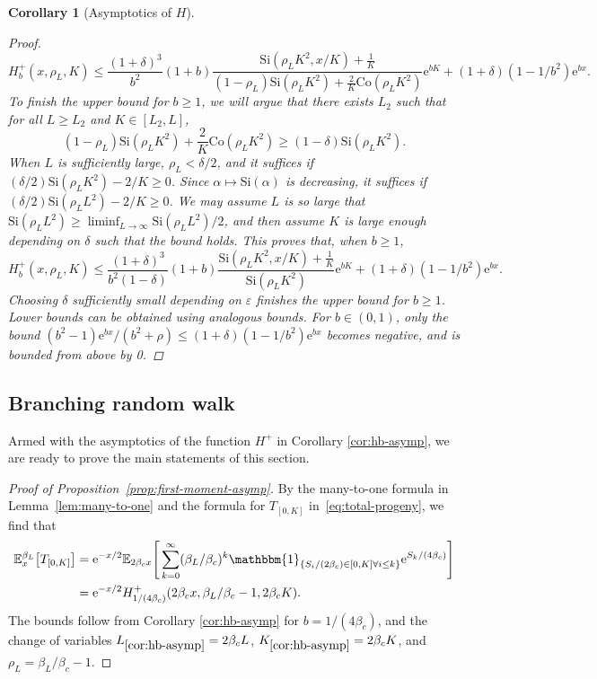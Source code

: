 \documentclass[a4paper, a4wide, 10pt, reqno]{amsart}
\theoremstyle{plain}
\newtheorem{corollary}[theorem]{Corollary}
\theoremstyle{definition}
\numberwithin{equation}{section}
\newcommand{\E}{\mathbb E}
\newcommand{\re}{{\mathrm e}}
\newcommand{\Co}{{\mathrm{Co}}}
\newcommand{\Si}{{\mathrm{Si}}}
\newcommand{\ind}[1]{\mathbbm{1}_{\{#1\}}}
\begin{document}
\begin{corollary}[Asymptotics of $H$]
\begin{proof}
\[        H_b^+(x, \rho_L, K) \le \frac{(1+\delta)^3}{b^2}(1+b)\frac{\Si(\rho_L K^2, x/K) + \frac{1}{K}}{(1-\rho_L)\Si(\rho_L K^2) + \frac{2}{K}\Co(\rho_L K^2)}\re^{bK} + (1+\delta)(1-1/b^2)\re^{bx}.
        \]
        To finish the upper bound for $b\ge 1$, we will argue that there exists $L_2$ such that for all $L\ge L_2$ and $K\in[L_2, L]$,
        \begin{equation}\label{eq:asymp-h-2}
        (1-\rho_L)\Si(\rho_L K^2) + \frac{2}{K}\Co(\rho_L K^2)\ge (1-\delta)\Si(\rho_L K^2).
        \end{equation}
        When $L$ is sufficiently large, $\rho_L<\delta/2$, and it suffices if $(\delta/2)\Si(\rho_L K^2) - 2/K \ge 0$. Since $\alpha\mapsto\Si(\alpha)$ is decreasing, it suffices if $(\delta/2)\Si(\rho_L L^2) - 2/K \ge 0$. We may assume $L$ is so large that $\Si(\rho_L L^2)\ge \liminf_{L\to\infty}\Si(\rho_L L^2)/2$, and then assume $K$ is large enough depending on $\delta$ such that the bound holds. This proves that, when $b\ge 1$,
        \[
        H_b^+(x, \rho_L, K) \le \frac{(1+\delta)^3}{b^2(1-\delta)}(1+b)\frac{\Si(\rho_L K^2, x/K) + \frac{1}{K}}{\Si(\rho_L K^2)}\re^{bK} + (1+\delta)(1-1/b^2)\re^{bx}.
        \]
        Choosing $\delta$ sufficiently small depending on $\varepsilon$ finishes the upper bound for $b\ge 1$. Lower bounds can be obtained using analogous bounds. For $b\in(0,1)$, only the bound $(b^2-1)\re^{bx}/(b^2+\rho)\le (1+\delta) (1-1/b^2)\re^{bx}$ becomes negative, and is bounded from above by 0. 
    \end{proof}
\end{corollary}
\subsection{Branching random walk}\label{sec:brw-progeny}
Armed with the asymptotics of the function $H^+$ in Corollary \ref{cor:hb-asymp}, we are ready to prove the main statements of this section.
\begin{proof}[Proof of Proposition~\ref{prop:first-moment-asymp}]
    By the many-to-one formula in Lemma~\ref{lem:many-to-one} and the formula for $T_{[0, K]}$ in~\eqref{eq:total-progeny}, we find that 
    \[
    \begin{aligned}
    \E_x^{\beta_L}\big[T_{[0,K]}\big]&=\re^{-x/2}\E_{2\beta_cx}\Bigg[\sum_{k=0}^\infty(\beta_L/\beta_c)^k\ind{S_i/(2\beta_c)\in[0, K]\forall i\le k}\re^{S_k/(4\beta_c)}\Bigg] \\
    &= \re^{-x/2}H^+_{1/(4\beta_c)}(2\beta_cx, \beta_L/\beta_c-1, 2\beta_cK).
    \end{aligned}
    \]
    The bounds follow from Corollary \ref{cor:hb-asymp} for $b=1/(4\beta_c)$, and the change of variables $L_{\ref{cor:hb-asymp}}=2\beta_cL$, $K_{\ref{cor:hb-asymp}}=2\beta_cK$, and $\rho_L=\beta_L/\beta_c-1$.
\end{proof}
\end{document}
